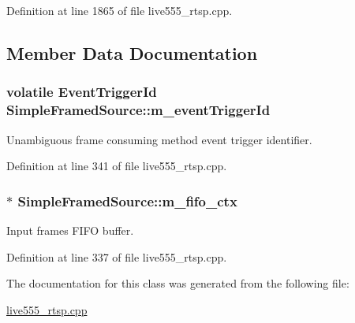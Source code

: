 Definition at line 1865 of file live555\+\_\+rtsp.\+cpp.



\subsection{Member Data Documentation}
\subsubsection[{\texorpdfstring{m\+\_\+event\+Trigger\+Id}{m_eventTriggerId}}]{\setlength{\rightskip}{0pt plus 5cm}volatile Event\+Trigger\+Id Simple\+Framed\+Source\+::m\+\_\+event\+Trigger\+Id}\hypertarget{classSimpleFramedSource_a6de7be242a550522e914316487fa112e}{}\label{classSimpleFramedSource_a6de7be242a550522e914316487fa112e}
Unambiguous frame consuming method event trigger identifier. 

Definition at line 341 of file live555\+\_\+rtsp.\+cpp.

\subsubsection[{\texorpdfstring{m\+\_\+fifo\+\_\+ctx}{m_fifo_ctx}}]{$\ast$ Simple\+Framed\+Source\+::m\+\_\+fifo\+\_\+ctx}\hypertarget{classSimpleFramedSource_ab93999240c393d2d3035dc7e5292eb2c}{}\label{classSimpleFramedSource_ab93999240c393d2d3035dc7e5292eb2c}
Input frames F\+I\+FO buffer. 

Definition at line 337 of file live555\+\_\+rtsp.\+cpp.



The documentation for this class was generated from the following file\+:\begin{DoxyCompactItemize}
\item 
\hyperlink{live555__rtsp_8cpp}{live555\+\_\+rtsp.\+cpp}\end{DoxyCompactItemize}
